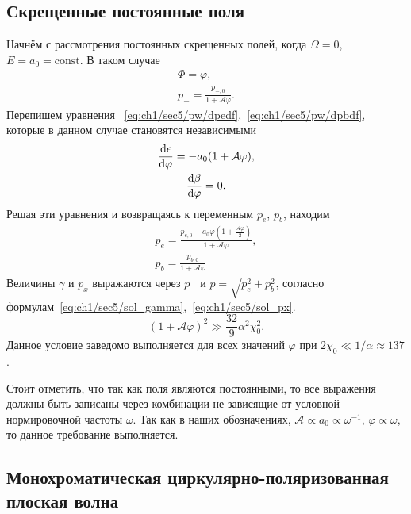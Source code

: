 \subsection{Скрещенные постоянные поля}
\label{sub:ch1/sec6/CCF}

Начнём с рассмотрения постоянных скрещенных полей, когда ${\Omega=0}$,~${E=a_0=\text{const}}$.
В таком случае
\begin{gather}
    \Phi = \varphi, \\
    p_- = \frac{p_{-,0}}{1 + \mathcal{A}\varphi}.
\end{gather}
Перепишем уравнения ~\eqref{eq:ch1/sec5/pw/dpedf},~\eqref{eq:ch1/sec5/pw/dpbdf}, которые в данном случае становятся независимыми
\begin{gather}
    \dv{\epsilon}{\varphi} = -a_0 (1+\mathcal{A}\varphi) , \\
    \dv{\beta}{\varphi} = 0.
\end{gather}
Решая эти уравнения и возвращаясь к переменным $p_e$, $p_b$, находим
\begin{gather}
    p_e = \frac{p_{e,0} - a_0 \varphi \left( 1 + \frac{\mathcal{A}\varphi}{2} \right)}{1 + \mathcal{A}\varphi}, \\
    p_b = \frac{p_{b,0}}{1 + \mathcal{A}\varphi}
\end{gather}
Величины $\gamma$ и $p_x$ выражаются через $p_-$ и  $p=\sqrt{p_e^2+p_b^2}$, согласно формулам~\eqref{eq:ch1/sec5/sol_gamma},~\eqref{eq:ch1/sec5/sol_px}.
\begin{equation}
     \left( 1  + \mathcal{A} \varphi \right)^2 \gg \frac{32}{9} \alpha^2 \chi_0^2.
\end{equation}
Данное условие заведомо выполняется для всех значений $\varphi$ при ${2 \chi_0 \ll 1/\alpha \approx 137}$.

Стоит отметить, что так как поля являются постоянными, то все выражения должны быть записаны через комбинации не зависящие от условной нормировочной частоты $\omega$.
Так как в наших обозначениях, $\mathcal{A} \propto a_0 \propto \omega^{-1}$, $\varphi\propto \omega$, то данное требование выполняется.

\subsection{Монохроматическая циркулярно-поляризованная плоская волна}
\label{sub:ch1/sec6/CPW}

